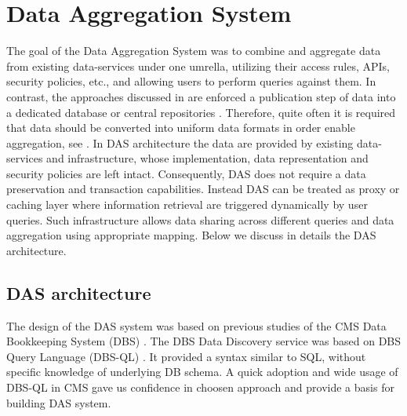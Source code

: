 \documentclass[1p,times]{elsarticle}
\begin{document}
\section{Data Aggregation System\label{DAS}}
The goal of the Data Aggregation System was to combine and
aggregate data from existing data-services
under one umrella, utilizing their access rules, APIs, security policies, etc., and
allowing users to perform queries against them. In contrast, the approaches
discussed in \cite{DBXplorer, QueryAnswer, FedDB} are
enforced a publication step of data into a dedicated database 
or central repositories \cite{iRODS}. Therefore, quite often it is required
that data should be converted into uniform data formats in order enable
aggregation, see \cite{OpenArchive}. In DAS architecture the data are provided
by existing data-services and infrastructure, whose implementation,
data representation and security policies are left intact. Consequently,
DAS does not require a data preservation and transaction capabilities. 
Instead DAS can be treated
as proxy or caching layer where information retrieval are triggered dynamically
by user queries. Such infrastructure allows data sharing across different queries and
data aggregation using appropriate mapping. Below we discuss in details the
DAS architecture.

\subsection{DAS architecture}
The design of the DAS system was based on previous studies of the CMS Data 
Bookkeeping System (DBS) \cite{DBS, DBS07}. The DBS Data Discovery service
\cite{DD} was based on DBS Query Language (DBS-QL) \cite{DBS-QL}. It provided
a syntax similar to SQL, without specific knowledge of underlying DB schema.
A quick adoption and wide usage of DBS-QL in CMS gave us confidence in choosen approach 
and provide a basis for building DAS system.
\end{document}
